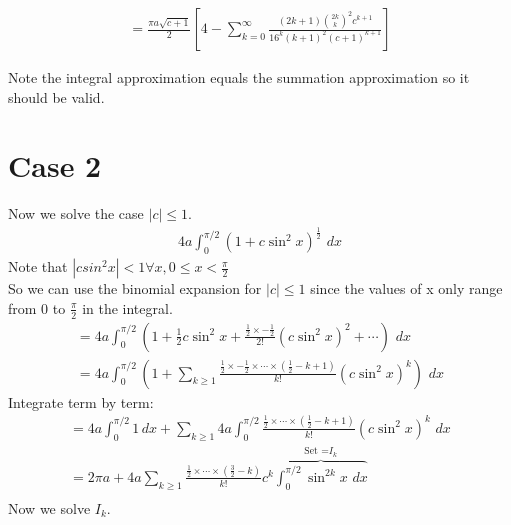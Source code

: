 \documentclass{article}
\begin{document}
\begin{tcolorbox}
\begin{equation*}
\begin{split}
	= \frac{\pi a\sqrt{c+1}}{2} \left[4 - \sum_{k=0}^{\infty}\frac{(2k+1){{2k}\choose k}^2c^{k+1}}{16^k(k+1)^2(c+1)^{k+1}}\right]
\end{split}
\end{equation*}
\end{tcolorbox}
Note the integral approximation equals the summation approximation so it should be valid.



\section{Case 2}
Now we solve the case $|c| \leq 1$.
\begin{equation*}
\begin{split}
	4a\int_{0}^{\pi/2}(1 + c\sin^2x)^\frac{1}{2}\,\,dx
\end{split}
\end{equation*}
Note that $|csin^2x|<1\forall x, 0\leq x < \frac{\pi}{2}$\\
So we can use the binomial expansion for $|c|\leq 1$ since the values of x only range from 0 to $\frac{\pi}{2}$ in the integral.
\begin{equation*}
\begin{split}
	= 4a\int_{0}^{\pi/2}\left(1 + \frac{1}{2}c\sin^2x + \frac{\frac{1}{2}\times-\frac{1}{2}}{2!}(c\sin^2x)^2+\cdots\right)\,\,dx\\
	= 4a\int_{0}^{\pi/2}\left(1 + \sum_{k\geq 1}\frac{\frac{1}{2}\times-\frac{1}{2}\times\cdots\times(\frac{1}{2}-k+1)}{k!}(c\sin^2x)^k\right)\,\,dx
\end{split}
\end{equation*}
Integrate term by term:
\begin{equation}
\begin{split}
	= 4a\int_{0}^{\pi/2}1\,dx + \sum_{k\geq 1}4a\int_{0}^{\pi/2} \frac{\frac{1}{2}\times\cdots\times(\frac{1}{2}-k+1)}{k!}(c\sin^2x)^k\,\,dx\\
	= 2\pi a+4a\sum_{k\geq 1}\frac{\frac{1}{2}\times\cdots\times(\frac{3}{2}-k)}{k!}c^k\overbrace{\int_{0}^{\pi/2}\sin^{2k}x\,\,dx}^\text{Set =$I_k$}\\
\end{split}
\end{equation}
Now we solve $I_k$.
\end{document}
